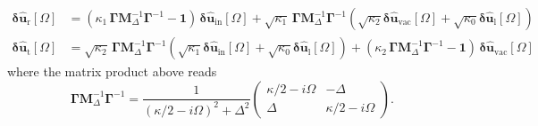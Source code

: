 \begin{equation}
  \begin{split}
  \mathbf{\delta \hat{u}_{\mathrm{r}}}[\Omega]  &= ( \kappa_1 \, \mathbf{\Gamma} \mathbf{M}^{-1}_\Delta \mathbf{\Gamma}^{-1}- \mathbf{1} )\, \mathbf{\delta \hat{u}_{\mathrm{in}}}[\Omega] +  \sqrt{\kappa_1} \,\mathbf{\Gamma}  \mathbf{M}^{-1}_\Delta \mathbf{\Gamma}^{-1} (\sqrt{\kappa_2} \mathbf{\delta \hat{u}_{\mathrm{vac}}}[\Omega] + \sqrt{\kappa_0}  \mathbf{\delta \hat{u}_{\mathrm{l}}}[\Omega] ) \\
  \mathbf{\delta \hat{u}_{\mathrm{t}}}[\Omega] & =  \sqrt{\kappa_2} \,\mathbf{\Gamma}  \mathbf{M}^{-1}_\Delta \mathbf{\Gamma}^{-1} (\sqrt{\kappa_1} \mathbf{\delta \hat{u}_{\mathrm{in}}}[\Omega] + \sqrt{\kappa_0}  \mathbf{\delta \hat{u}_{\mathrm{l}}}[\Omega] ) +  (\kappa_2 \,\mathbf{\Gamma}  \mathbf{M}^{-1}_\Delta \mathbf{\Gamma}^{-1}- \mathbf{1}) \, \mathbf{\delta \hat{u}_{\mathrm{vac}}}[\Omega] 
  \end{split}
\end{equation}
where the matrix product above reads 
\begin{equation*}
  \mathbf{\Gamma}  \mathbf{M}^{-1}_\Delta \mathbf{\Gamma}^{-1}
= \frac{1}{\left(\kappa/2-i\Omega\right)^{2}+\Delta^{2}}
\begin{pmatrix}
\kappa/2-i\Omega & -\Delta \\[6pt]
\Delta & \kappa/2-i\Omega
\end{pmatrix}.
\end{equation*}


